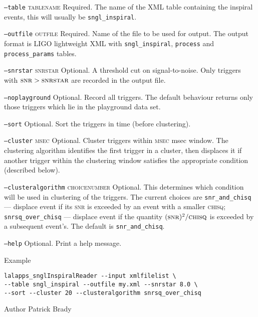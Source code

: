 \begin{entry}
\begin{entry}
\item[\texttt{--table} \textsc{tablename}] Required.  The name of the 
XML table containing the inspiral events, this will usually be 
\texttt{sngl\_inspiral}.

\item[\texttt{--outfile} \textsc{outfile}] Required.  Name of the file
to be used for output.  The output format is LIGO lightweight XML with
\texttt{sngl\_inspiral}, \texttt{process} and \texttt{process\_params}
tables. 

\item[\texttt{--snrstar} \textsc{snrstar}] Optional.  A threshold cut
on signal-to-noise.  Only triggers with $\textsc{snr} > \textsc{snrstar}$
are recorded in the output file.

\item[\texttt{--noplayground}] Optional.  Record all triggers.  The
default behaviour returns only those triggers which lie in the
playground data set.  

\item[\texttt{--sort}] Optional.   Sort the triggers in time (before
clustering).  

\item[\texttt{--cluster} \textsc{msec}] Optional.  Cluster triggers
within \textsc{msec} msec window.   The clustering algorithm
identifies the first trigger in a cluster, then displaces it if another 
trigger within the clustering window satisfies the appropriate condition 
(described below).

\item[\texttt{--clusteralgorithm} \textsc{choicenumber}]  Optional.  This
determines which condition will be used in clustering of the triggers.
The current choices are \texttt{snr\_and\_chisq} --- displace event if
its \textsc{snr} is exceeded by an event with a smaller
\textsc{chisq}; \texttt{snrsq\_over\_chisq} --- displace event if the
quantity $(\textsc{snr})^{2}/\textsc{chisq}$ is exceeded by a subsequent
event's.  The default is \texttt{snr\_and\_chisq}.

\item[\texttt{--help}] Optional.  Print a help message.
\end{entry}

\item[Example]
\begin{verbatim}
lalapps_snglInspiralReader --input xmlfilelist \
--table sngl_inspiral --outfile my.xml --snrstar 8.0 \
--sort --cluster 20 --clusteralgorithm snrsq_over_chisq
\end{verbatim}

\item[Author] 
Patrick Brady
\end{entry}
\clearpage


